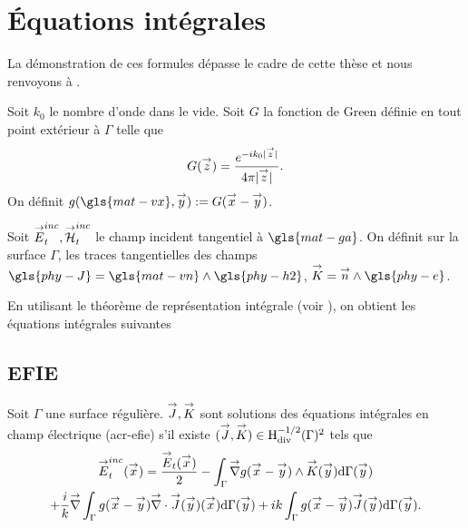 \section{Équations intégrales}

    La démonstration de ces formules dépasse le cadre de cette thèse et nous renvoyons à \cite[\textsection~5.6]{nedelec_mixed_1980}.

    Soit \(k_0\) le nombre d'onde dans le vide.
    Soit \(G\) la fonction de Green définie en tout point extérieur à \(\Gamma\) telle que
    \begin{equation*}
      G(\vz) = \frac{e^{-ik_0|\vz|}}{4\pi|\vz|}.
    \end{equation*}
    On définit \(g(\gls{mat-vx},\vy) := G(\vx - \vy)\).

    Soit \(\vE^{inc}_t,\vH^{inc}_t\) le champ incident tangentiel à \(\gls{mat-ga}\). On définit sur la surface \(\Gamma\), les traces tangentielles des champs \(\gls{phy-J} = \gls{mat-vn} \pvect \gls{phy-h2}\), \(\vK = \vn \pvect \gls{phy-e}\).

    En utilisant le théorème de représentation intégrale (voir \cite[Théorème 5.5.1]{nedelec_acoustic_2001}), on obtient les équations intégrales suivantes
    \subsection{EFIE}

      \begin{prop}
        \label{eq:form_int:EFIE}
        Soit \(\Gamma\) une surface régulière.
        \(\vJ,\vK\) sont solutions des équations intégrales en champ électrique (\gls{acr-efie}) s'il existe \((\vJ,\vK) \in \Hdiv^{-1/2}(\Gamma)^2\) tels que
        \begin{multline*}
          \vE^{inc}_t(\vx) =
            \frac{\vE_t(\vx)}{2}
              - \int_{\Gamma} \vgrad g(\vx - \vy) \pvect \vK(\vy) \dd{\Gamma}(\vy) \\
            + \frac{i}{k}\vgrad \int_{\Gamma}  g(\vx - \vy)\vdiv\vJ(\vy)(\vx) \dd{\Gamma}(\vy)
              +  ik\int_{\Gamma} g(\vx - \vy)\vJ(\vy) \dd{\Gamma}(\vy).
        \end{multline*}
      \end{prop}


